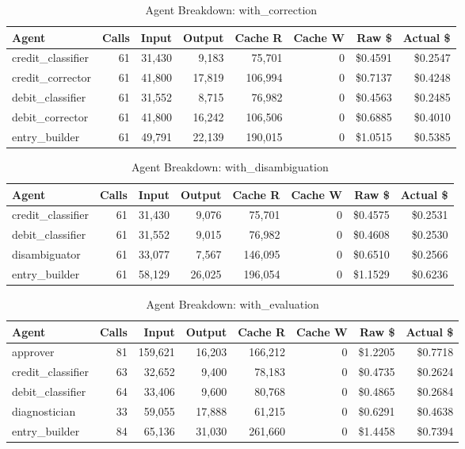 \begin{table}[htbp]
\centering
\caption{Agent Breakdown: with\_correction}
\label{tab:agent-with-correction}
\begin{tabular}{l r rr rr rr}
\toprule
Agent & Calls & Input & Output & Cache R & Cache W & Raw \$ & Actual \$ \\
\midrule
  credit\_classifier & 61 & 31,430 & 9,183 & 75,701 & 0 & \$0.4591 & \$0.2547 \\
  credit\_corrector & 61 & 41,800 & 17,819 & 106,994 & 0 & \$0.7137 & \$0.4248 \\
  debit\_classifier & 61 & 31,552 & 8,715 & 76,982 & 0 & \$0.4563 & \$0.2485 \\
  debit\_corrector & 61 & 41,800 & 16,242 & 106,506 & 0 & \$0.6885 & \$0.4010 \\
  entry\_builder & 61 & 49,791 & 22,139 & 190,015 & 0 & \$1.0515 & \$0.5385 \\
\bottomrule
\end{tabular}
\end{table}

\begin{table}[htbp]
\centering
\caption{Agent Breakdown: with\_disambiguation}
\label{tab:agent-with-disambiguation}
\begin{tabular}{l r rr rr rr}
\toprule
Agent & Calls & Input & Output & Cache R & Cache W & Raw \$ & Actual \$ \\
\midrule
  credit\_classifier & 61 & 31,430 & 9,076 & 75,701 & 0 & \$0.4575 & \$0.2531 \\
  debit\_classifier & 61 & 31,552 & 9,015 & 76,982 & 0 & \$0.4608 & \$0.2530 \\
  disambiguator & 61 & 33,077 & 7,567 & 146,095 & 0 & \$0.6510 & \$0.2566 \\
  entry\_builder & 61 & 58,129 & 26,025 & 196,054 & 0 & \$1.1529 & \$0.6236 \\
\bottomrule
\end{tabular}
\end{table}

\begin{table}[htbp]
\centering
\caption{Agent Breakdown: with\_evaluation}
\label{tab:agent-with-evaluation}
\begin{tabular}{l r rr rr rr}
\toprule
Agent & Calls & Input & Output & Cache R & Cache W & Raw \$ & Actual \$ \\
\midrule
  approver & 81 & 159,621 & 16,203 & 166,212 & 0 & \$1.2205 & \$0.7718 \\
  credit\_classifier & 63 & 32,652 & 9,400 & 78,183 & 0 & \$0.4735 & \$0.2624 \\
  debit\_classifier & 64 & 33,406 & 9,600 & 80,768 & 0 & \$0.4865 & \$0.2684 \\
  diagnostician & 33 & 59,055 & 17,888 & 61,215 & 0 & \$0.6291 & \$0.4638 \\
  entry\_builder & 84 & 65,136 & 31,030 & 261,660 & 0 & \$1.4458 & \$0.7394 \\
\bottomrule
\end{tabular}
\end{table}
